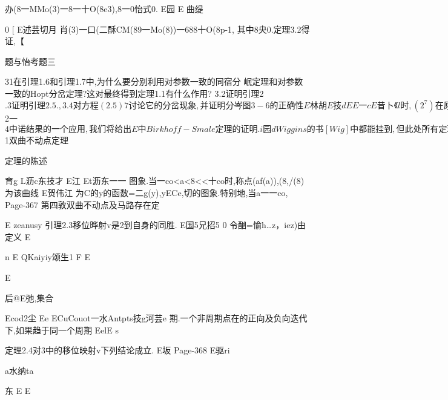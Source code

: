 {{{{{{{{{{{{{{{{{{办(8一MMo(3)一8一十O(8e3),8一0怡式0.
E园
E
曲缇

0
[
E述芸切月
肖(3)一口(二酥CM(89一Mo(8))一688十O(8p-1,
其中8央0.定理3.2得证,【

题与怡考题三

31在引理1.6和引理1.7中,为什么要分别利用对参数一致的同宿分
岷定理和对参数一致的Hopt分岔定理?这对最终得到定理1.1有什么作用?
3.2证明引理2
$.3证明引理2.5.,
3.4对方程(2.5)7讨论它的分岔现象,并证明分岑图3-6的正确性
E林胡
E技d

E
E一

c
E昔卜《l时,(2^7)在原点的发散量为弼奂0.)
Page-365
E招

河八
s,使得对其巾任意序列口一(aijiez,古一仁jez,有a二页.下
EoEl志
医沥朱达朐许4
E0沥团E沥
ui志江东5国衍
6
浩
E
U扬一才扬
[史
bnd吴河
心巳经取定,取aL1EKu使得心1世i一0,1,

2

1一
E

E水
人
[

[不

一
c东|

E
E沥
2
Page-366
医沥l李

2
五章中是我们研究空间R中歌点同宿分岔的基础,同E
也有其自身的重要价值.在81中我们证明一个双曲不动点定理.
在2中引进符号助力学的基本概念.在83中给出马蹄存在定理
E
引理.在85中作为$2一$4中诺结果的一个应用,我们将给出E
中Birkhoff-Smale定理的证明.

i园d
Wiggins的书[Wig]中都能挂到,但此处所有定理的证明郭是独立
给出的.我们力图把儿何直观与数学的严密性统一起来,并给予
读者一套易于掌握的方法,用以解决高维空间中其它类似的闰题.

$1双曲不动点定理

定理的陈述

育g
L沥c东技才
E江
Et沥东一一
图象.当一co<a<8<<十co时,称点(af(a)),(8,/(8)为该曲线
E贺伟江
为C的y的函数=二g(y),yECe,切的图象.特别地,当a一一co,
Page-367
第四敦双曲不动点及马路存在定

E
zeanusy
引理2.3移位晔射v是2到自身的同胜.
E国5兄招5
0
令酗=愉h…z，iez)由定义
E

n
E
QKaiyiy颂生1
F
E

E

后@E弛,集合

Ecod2尘
Ee
ECuCouot一水Antpts技g河芸e
期.一个非周期点在的正向及负向迭代下,如果趋于同一个周期
EelE
s

定理2.4对3中的移位映射v下列结论成立.
E坂
Page-368
E驱ri

a水纳ta

东
E
E

}}}}}}}}}}}}}}}}}}
